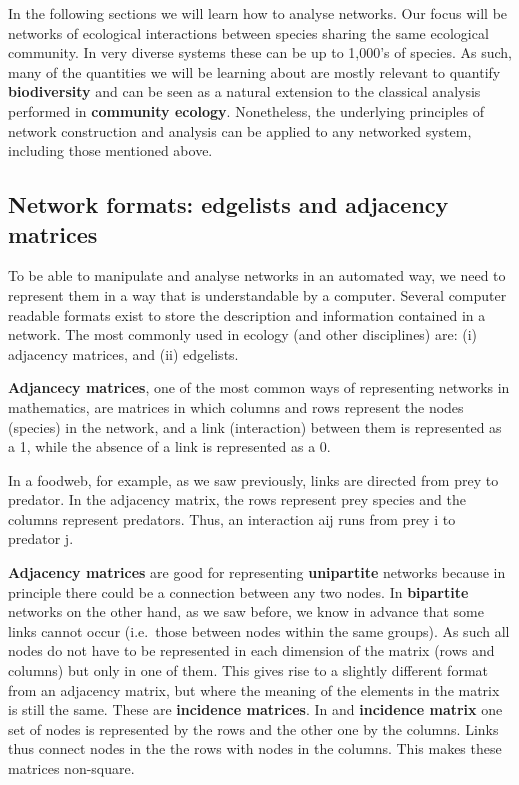 \documentclass[
]{article}
\begin{document}
In the following sections we will learn how to analyse networks. Our
focus will be networks of ecological interactions between species
sharing the same ecological community. In very diverse systems these can
be up to 1,000's of species. As such, many of the quantities we will be
learning about are mostly relevant to quantify \textbf{biodiversity} and
can be seen as a natural extension to the classical analysis performed
in \textbf{community ecology}. Nonetheless, the underlying principles of
network construction and analysis can be applied to any networked
system, including those mentioned above.

\subsection{Network formats: edgelists and adjacency
matrices}\label{network-formats-edgelists-and-adjacency-matrices}

To be able to manipulate and analyse networks in an automated way, we
need to represent them in a way that is understandable by a computer.
Several computer readable formats exist to store the description and
information contained in a network. The most commonly used in ecology
(and other disciplines) are: (i) adjacency matrices, and (ii) edgelists.

\textbf{Adjancecy matrices}, one of the most common ways of representing
networks in mathematics, are matrices in which columns and rows
represent the nodes (species) in the network, and a link (interaction)
between them is represented as a 1, while the absence of a link is
represented as a 0.

In a foodweb, for example, as we saw previously, links are directed from
prey to predator. In the adjacency matrix, the rows represent prey
species and the columns represent predators. Thus, an interaction aij
runs from prey i to predator j.

\textbf{Adjacency matrices} are good for representing
\textbf{unipartite} networks because in principle there could be a
connection between any two nodes. In \textbf{bipartite} networks on the
other hand, as we saw before, we know in advance that some links cannot
occur (i.e.~those between nodes within the same groups). As such all
nodes do not have to be represented in each dimension of the matrix
(rows and columns) but only in one of them. This gives rise to a
slightly different format from an adjacency matrix, but where the
meaning of the elements in the matrix is still the same. These are
\textbf{incidence matrices}. In and \textbf{incidence matrix} one set of
nodes is represented by the rows and the other one by the columns. Links
thus connect nodes in the the rows with nodes in the columns. This makes
these matrices non-square.
\end{document}
